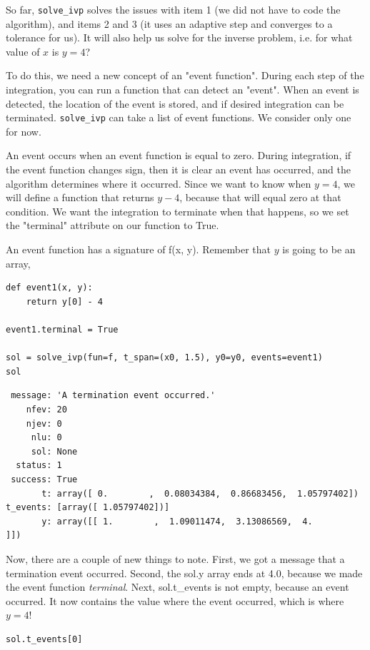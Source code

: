 \documentclass[11pt]{article}
\begin{document}
So far, \texttt{solve\_ivp} solves the issues with item 1 (we did not have to code the algorithm), and items 2 and 3 (it uses an adaptive step and converges to a tolerance for us). It will also help us solve for the inverse problem, i.e. for what value of \(x\) is \(y=4\)?

To do this, we need a new concept of an "event function". During each step of the integration, you can run a function that can detect an "event". When an event is detected, the location of the event is stored, and if desired integration can be terminated. \texttt{solve\_ivp} can take a list of event functions. We consider only one for now.

An event occurs when an event function is equal to zero. During integration, if the event function changes sign, then it is clear an event has occurred, and the algorithm determines where it occurred. Since we want to know when \(y=4\), we will define a function that returns \(y - 4\), because that will equal zero at that condition. We want the integration to terminate when that happens, so we set the "terminal" attribute on our function to True.

An event function has a signature of f(x, y). Remember that \(y\) is going to be an array,

\begin{verbatim}
def event1(x, y):
    return y[0] - 4

event1.terminal = True

sol = solve_ivp(fun=f, t_span=(x0, 1.5), y0=y0, events=event1)
sol
\end{verbatim}

\begin{verbatim}
 message: 'A termination event occurred.'
    nfev: 20
    njev: 0
     nlu: 0
     sol: None
  status: 1
 success: True
       t: array([ 0.        ,  0.08034384,  0.86683456,  1.05797402])
t_events: [array([ 1.05797402])]
       y: array([[ 1.        ,  1.09011474,  3.13086569,  4.        ]])
\end{verbatim}

Now, there are a couple of new things to note. First, we got a message that a termination event occurred. Second, the sol.y array ends at 4.0, because we made the event function \emph{terminal}. Next, sol.t\_events is not empty, because an event occurred. It now contains the value where the event occurred, which is where \(y=4\)!

\begin{verbatim}
sol.t_events[0]
\end{verbatim}
\end{document}
